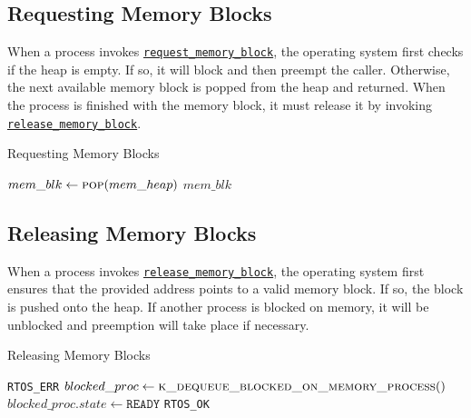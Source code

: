 \documentclass[12pt]{report}
\begin{document}
\subsection{Requesting Memory Blocks}

When a process invokes \hyperref[alg:requestingmemoryblocks]{\texttt{request_memory_block}}, the operating system first checks if the heap is empty. If so, it will block and then preempt the caller. Otherwise, the next available memory block is popped from the heap and returned. When the process is finished with the memory block, it must release it by invoking \hyperref[alg:releasingmemoryblocks]{\texttt{release_memory_block}}.\\

\begin{algorithm}
\caption{Requesting Memory Blocks}
\label{alg:requestingmemoryblocks}
\begin{algorithmic}[1]
        \State {}
        \State {}
    \EndWhile
    \State $mem\_blk \leftarrow \Call{pop}{mem\_heap}$
    \State \Return $mem\_blk$
\EndProcedure
\end{algorithmic}
\end{algorithm}

\subsection{Releasing Memory Blocks}

When a process invokes \hyperref[alg:releasingmemoryblocks]{\texttt{release_memory_block}}, the operating system first ensures that the provided address points to a valid memory block. If so, the block is pushed onto the heap. If another process is blocked on memory, it will be unblocked and preemption will take place if necessary.\\

\begin{algorithm}
\caption{Releasing Memory Blocks}
\label{alg:releasingmemoryblocks}
\begin{algorithmic}[1]
        \State \Return \texttt{RTOS_ERR}
    \EndIf
    \State {}
        \State $blocked\_proc \leftarrow \Call{k\_dequeue\_blocked\_on\_memory\_process}{\null}$
        \State $blocked\_proc.state \leftarrow \texttt{READY}$
        \State {}
        \State {}
    \EndIf
    \State \Return \texttt{RTOS_OK}
\EndProcedure
\end{algorithmic}
\end{algorithm}
\end{document}
